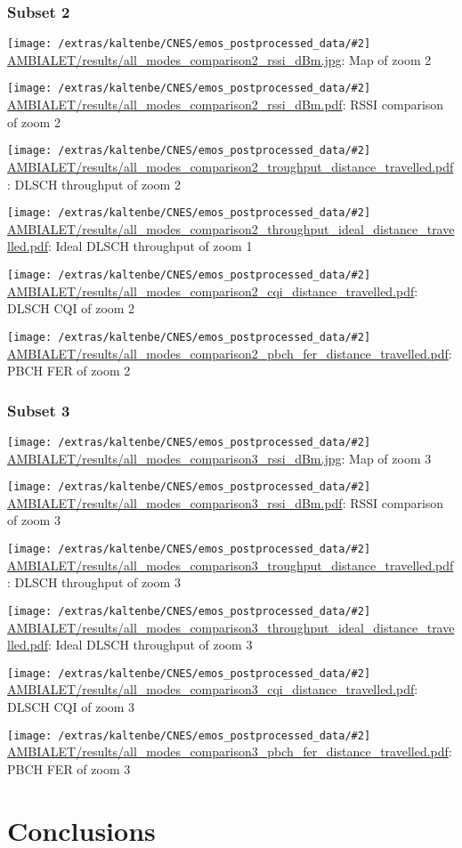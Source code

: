 \documentclass[a4paper,10pt]{article}
\newcommand{\printfile}[2][]{
 \begin{minipage}{8cm}
  \centering
  \texttt{[image: /extras/kaltenbe/CNES/emos\_postprocessed\_data/\#2]}
  \url{#2}: #1

 \end{minipage}
}
\begin{document}
\subsubsection*{Subset 2}

\printfile[Map of zoom 2]{AMBIALET/results/all_modes_comparison2_rssi_dBm.jpg}
\printfile[RSSI comparison of zoom 2]{AMBIALET/results/all_modes_comparison2_rssi_dBm.pdf}

\printfile[DLSCH throughput of zoom 2]{AMBIALET/results/all_modes_comparison2_troughput_distance_travelled.pdf}
\printfile[Ideal DLSCH throughput of zoom 1]{AMBIALET/results/all_modes_comparison2_throughput_ideal_distance_travelled.pdf}

\printfile[DLSCH CQI of zoom 2]{AMBIALET/results/all_modes_comparison2_cqi_distance_travelled.pdf}
\printfile[PBCH FER of zoom 2]{AMBIALET/results/all_modes_comparison2_pbch_fer_distance_travelled.pdf}

\subsubsection*{Subset 3}

\printfile[Map of zoom 3]{AMBIALET/results/all_modes_comparison3_rssi_dBm.jpg}
\printfile[RSSI comparison of zoom 3]{AMBIALET/results/all_modes_comparison3_rssi_dBm.pdf}

\printfile[DLSCH throughput of zoom 3]{AMBIALET/results/all_modes_comparison3_troughput_distance_travelled.pdf}
\printfile[Ideal DLSCH throughput of zoom 3]{AMBIALET/results/all_modes_comparison3_throughput_ideal_distance_travelled.pdf}

\printfile[DLSCH CQI of zoom 3]{AMBIALET/results/all_modes_comparison3_cqi_distance_travelled.pdf}
\printfile[PBCH FER of zoom 3]{AMBIALET/results/all_modes_comparison3_pbch_fer_distance_travelled.pdf}


\section{Conclusions}


 

\end{document}
